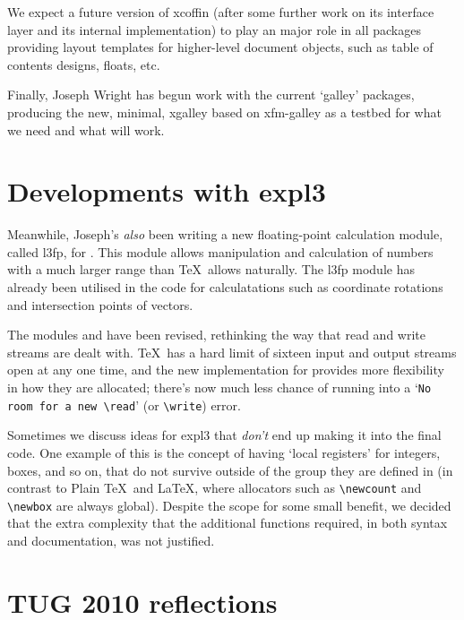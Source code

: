 \documentclass{ltnews}
\begin{document}
We expect a future version of \textsf{xcoffin} (after some further work on its
interface layer and its internal implementation) to play an major role in all
packages providing layout templates for higher-level document objects, such as
table of contents designs, floats, etc.

Finally,
Joseph Wright has begun work with the current `galley' packages, producing the
new, minimal, \textsf{xgalley} based on \textsf{xfm-galley} as a testbed for
what we need and what will work.


\section{Developments with \textsf{expl3}}

Meanwhile, Joseph's \emph{also} been writing a new floating-point calculation
module, called \textsf{l3fp}, for . This module allows manipulation
and calculation of numbers with a much larger range than \TeX\ allows
naturally. The \textsf{l3fp} module has already been utilised in the
 code for calculatations such as coordinate rotations and
intersection points of vectors.

The modules  and  have been revised, rethinking the way
that read and write streams are dealt with. \TeX\ has a hard limit of sixteen
input and output streams open at any one time, and the new implementation for
 provides more flexibility in how they are allocated; there's now
much less chance of running into a `\verb|No room for a new \read|' (or
\verb|\write|) error.

Sometimes we discuss ideas for \textsf{expl3} that \emph{don't} end up making
it into the final code. One example of this is the concept of having `local
registers' for integers, boxes, and so on, that do not survive outside of the
group they are defined in (in contrast to Plain \TeX\ and \LaTeX, where
allocators such as \verb|\newcount| and \verb|\newbox| are always global).
Despite the scope for some small benefit, we decided that the extra complexity
that the additional functions required, in both syntax and documentation, was
not justified.


\section{TUG 2010 reflections}


\end{document}
